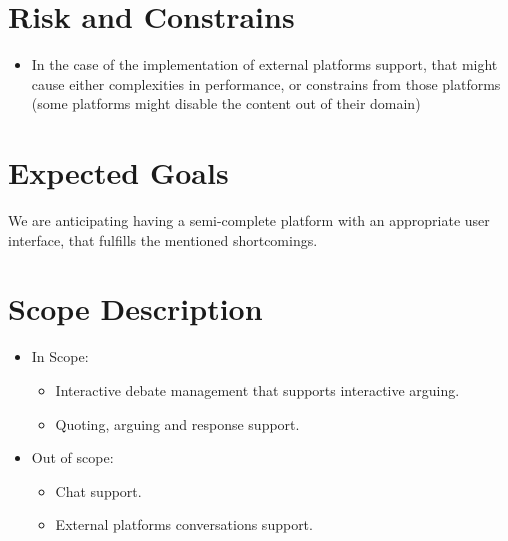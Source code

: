 \documentclass[11pt]{article}
\begin{document}
\section{Risk and Constrains}
\label{sec:org8a1718f}
\begin{itemize}
\item In the case of the implementation of external platforms support, that might cause either
complexities in performance, or constrains from those platforms (some platforms might
disable the content out of their domain)
\end{itemize}
\section{Expected Goals}
\label{sec:org2ce6815}
We are anticipating having a semi-complete platform with an appropriate user interface, that
fulfills the mentioned shortcomings.
\section{Scope Description}
\label{sec:org9610aba}
\begin{itemize}
\item In Scope:
\begin{itemize}
\item Interactive debate management that supports interactive arguing.
\item Quoting, arguing and response support.
\end{itemize}
\item Out of scope:
\begin{itemize}
\item Chat support.
\item External platforms conversations support.
\end{itemize}
\end{itemize}
\end{document}
